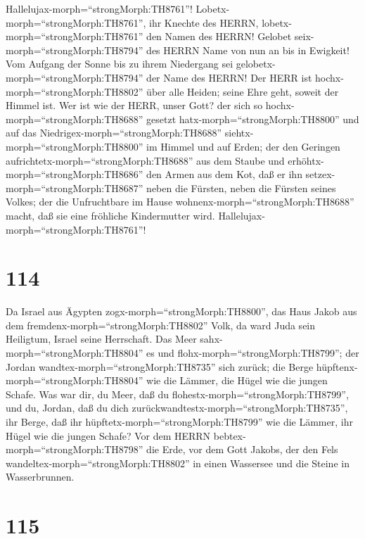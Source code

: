  Hallelujax-morph=``strongMorph:TH8761''!
Lobetx-morph=``strongMorph:TH8761'', ihr Knechte des HERRN,
lobetx-morph=``strongMorph:TH8761'' den Namen des HERRN! 
Gelobet seix-morph=``strongMorph:TH8794'' des HERRN Name von nun an bis
in Ewigkeit!  Vom Aufgang der Sonne bis zu ihrem Niedergang
sei gelobetx-morph=``strongMorph:TH8794'' der Name des HERRN!
 Der HERR ist hochx-morph=``strongMorph:TH8802'' über alle
Heiden; seine Ehre geht, soweit der Himmel ist.  Wer ist wie
der HERR, unser Gott? der sich so hochx-morph=``strongMorph:TH8688''
gesetzt hatx-morph=``strongMorph:TH8800''  und auf das
Niedrigex-morph=``strongMorph:TH8688''
siehtx-morph=``strongMorph:TH8800'' im Himmel und auf Erden;
 der den Geringen aufrichtetx-morph=``strongMorph:TH8688''
aus dem Staube und erhöhtx-morph=``strongMorph:TH8686'' den Armen aus
dem Kot,  daß er ihn setzex-morph=``strongMorph:TH8687''
neben die Fürsten, neben die Fürsten seines Volkes;  der die
Unfruchtbare im Hause wohnenx-morph=``strongMorph:TH8688'' macht, daß
sie eine fröhliche Kindermutter wird.
Hallelujax-morph=``strongMorph:TH8761''!

\hypertarget{section-113}{%
\section{114}\label{section-113}}

 Da Israel aus Ägypten zogx-morph=``strongMorph:TH8800'',
das Haus Jakob aus dem fremdenx-morph=``strongMorph:TH8802'' Volk,
 da ward Juda sein Heiligtum, Israel seine Herrschaft.
 Das Meer sahx-morph=``strongMorph:TH8804'' es und
flohx-morph=``strongMorph:TH8799''; der Jordan
wandtex-morph=``strongMorph:TH8735'' sich zurück;  die Berge
hüpftenx-morph=``strongMorph:TH8804'' wie die Lämmer, die Hügel wie die
jungen Schafe.  Was war dir, du Meer, daß du
flohestx-morph=``strongMorph:TH8799'', und du, Jordan, daß du dich
zurückwandtestx-morph=``strongMorph:TH8735'',  ihr Berge,
daß ihr hüpftetx-morph=``strongMorph:TH8799'' wie die Lämmer, ihr Hügel
wie die jungen Schafe?  Vor dem HERRN
bebtex-morph=``strongMorph:TH8798'' die Erde, vor dem Gott Jakobs,
 der den Fels wandeltex-morph=``strongMorph:TH8802'' in
einen Wassersee und die Steine in Wasserbrunnen.

\hypertarget{section-114}{%
\section{115}\label{section-114}}

